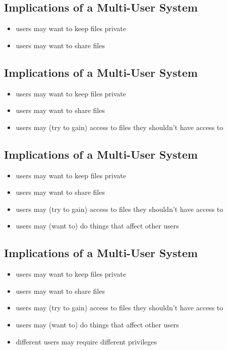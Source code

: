 \documentclass[xga]{xdvislides}
\begin{document}
\subsection{Implications of a Multi-User System}
\begin{itemize}
	\item users may want to keep files private
	\item users may want to share files
\end{itemize}

\subsection{Implications of a Multi-User System}
\begin{itemize}
	\item users may want to keep files private
	\item users may want to share files
	\item users may (try to gain) access to files they shouldn't have access to
\end{itemize}

\subsection{Implications of a Multi-User System}
\begin{itemize}
	\item users may want to keep files private
	\item users may want to share files
	\item users may (try to gain) access to files they shouldn't have access to
	\item users may (want to) do things that affect other users
\end{itemize}

\subsection{Implications of a Multi-User System}
\begin{itemize}
	\item users may want to keep files private
	\item users may want to share files
	\item users may (try to gain) access to files they shouldn't have access to
	\item users may (want to) do things that affect other users
	\item different users may require different privileges
\end{itemize}
\end{document}
